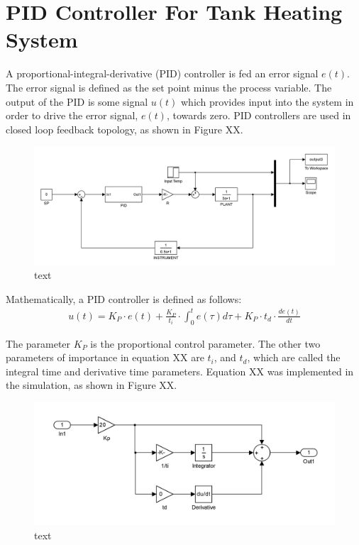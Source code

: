 \documentclass{article}
\begin{document}
\section{PID Controller For Tank Heating System}
A proportional-integral-derivative (PID) controller is fed an error signal $e(t)$. The error signal is defined as the set point minus the process variable. The output of the PID is some signal $u(t)$ which provides input into the system in order to drive the error signal, $e(t)$, towards zero. PID controllers are used in closed loop feedback topology, as shown in Figure XX.
\begin{figure}[h]
\centering
\includegraphics[scale=0.15]{block_45}
\caption{text}
\end{figure}

Mathematically, a PID controller is defined as follows:
\begin{align}
u(t) = K_P \cdot e(t) + \frac{K_P}{t_i} \cdot \int_{0}^{t} e(\tau) d\tau + K_P \cdot t_d \cdot \frac{de(t)}{dt}
\end{align}

The parameter $K_P$ is the proportional control parameter. The other two parameters of importance in equation XX are $t_i$, and $t_d$, which are called the integral time and derivative time parameters. Equation XX was implemented in the simulation, as shown in Figure XX.
\begin{figure}[h]
\centering
\includegraphics[scale=0.2]{block_3_pid}
\caption{text}
\end{figure}
\end{document}
